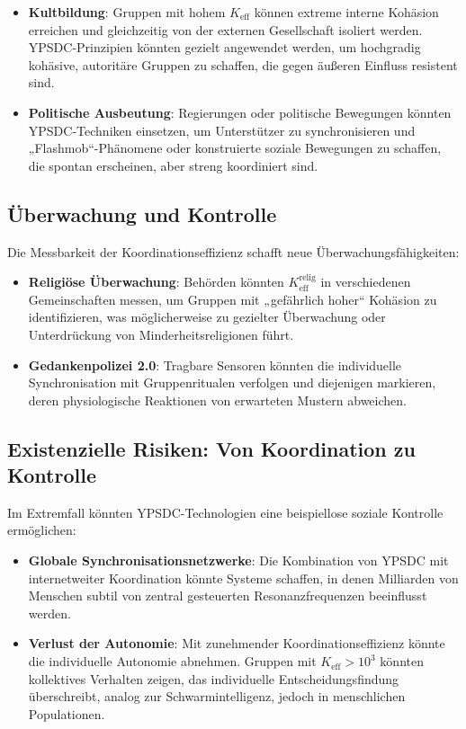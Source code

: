 \documentclass[12pt,a4paper]{article}
\begin{document}
	\begin{itemize}
		\item \textbf{Kultbildung}: Gruppen mit hohem $K_{\mathrm{eff}}$ können extreme interne Kohäsion erreichen und gleichzeitig von der externen Gesellschaft isoliert werden. YPSDC-Prinzipien könnten gezielt angewendet werden, um hochgradig kohäsive, autoritäre Gruppen zu schaffen, die gegen äußeren Einfluss resistent sind.
		
		\item \textbf{Politische Ausbeutung}: Regierungen oder politische Bewegungen könnten YPSDC-Techniken einsetzen, um Unterstützer zu synchronisieren und „Flashmob“-Phänomene oder konstruierte soziale Bewegungen zu schaffen, die spontan erscheinen, aber streng koordiniert sind.
	\end{itemize}
	
	\subsection{Überwachung und Kontrolle}
	
	Die Messbarkeit der Koordinationseffizienz schafft neue Überwachungsfähigkeiten:
	
	\begin{itemize}
		\item \textbf{Religiöse Überwachung}: Behörden könnten $K_{\mathrm{eff}}^{\mathrm{relig}}$ in verschiedenen Gemeinschaften messen, um Gruppen mit „gefährlich hoher“ Kohäsion zu identifizieren, was möglicherweise zu gezielter Überwachung oder Unterdrückung von Minderheitsreligionen führt.
		
		\item \textbf{Gedankenpolizei 2.0}: Tragbare Sensoren könnten die individuelle Synchronisation mit Gruppenritualen verfolgen und diejenigen markieren, deren physiologische Reaktionen von erwarteten Mustern abweichen.
	\end{itemize}
	
	\subsection{Existenzielle Risiken: Von Koordination zu Kontrolle}
	
	Im Extremfall könnten YPSDC-Technologien eine beispiellose soziale Kontrolle ermöglichen:
	
	\begin{itemize}
		\item \textbf{Globale Synchronisationsnetzwerke}: Die Kombination von YPSDC mit internetweiter Koordination könnte Systeme schaffen, in denen Milliarden von Menschen subtil von zentral gesteuerten Resonanzfrequenzen beeinflusst werden.
		
		\item \textbf{Verlust der Autonomie}: Mit zunehmender Koordinationseffizienz könnte die individuelle Autonomie abnehmen. Gruppen mit $K_{\mathrm{eff}} > 10^3$ könnten kollektives Verhalten zeigen, das individuelle Entscheidungsfindung überschreibt, analog zur Schwarmintelligenz, jedoch in menschlichen Populationen.
	\end{itemize}
	
\end{document}
